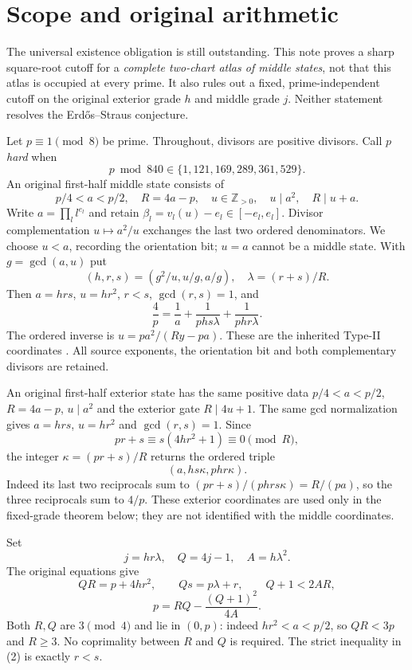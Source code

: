 \section{Scope and original arithmetic}
The universal existence obligation is still outstanding. This note proves a
sharp square-root cutoff for a \emph{complete two-chart atlas of middle states},
not that this atlas is occupied at every prime. It also rules out a fixed,
prime-independent cutoff on the original exterior grade $h$ and middle grade
$j$. Neither statement resolves the Erd\H{o}s--Straus conjecture.

Let $p\equiv1\pmod8$ be prime. Throughout, divisors are positive divisors.
Call $p$ \emph{hard} when
\[
 p\bmod840\in\{1,121,169,289,361,529\}.
\]
An original first-half middle state consists of
\[
 p/4<a<p/2,\quad R=4a-p,\quad u\in\mathbb Z_{>0},\quad
 u\mid a^2,\quad R\mid u+a.
\]
Write $a=\prod_l l^{e_l}$ and retain
$\beta_l=v_l(u)-e_l\in[-e_l,e_l]$. Divisor complementation $u\mapsto a^2/u$
exchanges the last two ordered denominators. We choose $u<a$, recording the
orientation bit; $u=a$ cannot be a middle state. With $g=\gcd(a,u)$ put
\[
 (h,r,s)=(g^2/u,u/g,a/g),\quad \lambda=(r+s)/R.
\]
Then $a=hrs$, $u=hr^2$, $r<s$, $\gcd(r,s)=1$, and
\[
 \frac4p=\frac1a+\frac1{phs\lambda}+\frac1{phr\lambda}.       \tag{1}
\]
The ordered inverse is $u=pa^2/(Ry-pa)$. These are the inherited Type-II
coordinates \cite[\S2, Proposition 2.6]{ET}. All source exponents, the orientation
bit and both complementary divisors are retained.

An original first-half exterior state has the same positive data
$p/4<a<p/2$, $R=4a-p$, $u\mid a^2$ and the exterior gate
$R\mid4u+1$.  The same gcd normalization gives $a=hrs$, $u=hr^2$ and
$\gcd(r,s)=1$.  Since
\[
 pr+s\equiv s(4hr^2+1)\equiv0\pmod R,
\]
the integer $\kappa=(pr+s)/R$ returns the ordered triple
\[
 (a,hs\kappa,phr\kappa).
\]
Indeed its last two reciprocals sum to
$(pr+s)/(phrs\kappa)=R/(pa)$, so the three reciprocals sum to $4/p$.
These exterior coordinates are used only in the fixed-grade theorem below;
they are not identified with the middle coordinates.

Set
\[
 j=hr\lambda,\quad Q=4j-1,\quad A=h\lambda^2.
\]
The original equations give
\[
 QR=p+4hr^2,\qquad Qs=p\lambda+r,\qquad Q+1<2AR,             \tag{2}
\]
\[
 \boxed{p=RQ-\frac{(Q+1)^2}{4A}.}                         \tag{3}
\]
Both $R,Q$ are $3\pmod4$ and lie in $(0,p)$: indeed $hr^2<a<p/2$, so
$QR<3p$ and $R\ge3$. No coprimality between $R$ and $Q$ is required.
The strict inequality in (2) is exactly $r<s$.


